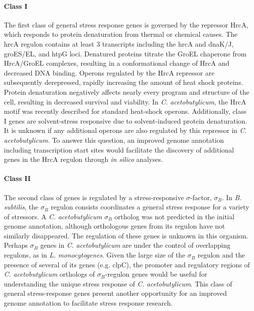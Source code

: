 \paragraph{Class I}
The first class of general stress response genes is governed by the repressor HrcA, which responds to protein denaturation from thermal or chemical causes. The hrcA regulon contains at least 3 transcripts including the hrcA and dnaK/J, groES/EL, and htpG loci.\cite{42} Denatured proteins titrate the GroEL chaperone from HrcA/GroEL complexes, resulting in a conformational change of HrcA and decreased DNA binding.\cite{77,78} Operons regulated by the HrcA repressor are subsequently derepressed, rapidly increasing the amount of heat shock proteins. Protein denaturation negatively affects nearly every program and structure of the cell, resulting in decreased survival and viability. In \textit{C. acetobutylicum}, the HrcA motif was recently described for standard heat-shock operons.\cite{42} Additionally, class I genes are solvent-stress responsive due to solvent-induced protein denaturation.\cite{74,75} It is unknown if any additional operons are also regulated by this repressor in \textit{C. acetobutylicum}. To answer this question, an improved genome annotation including transcription start sites would facilitate the discovery of additional genes in the HrcA regulon through \textit{in silico} analyses.

\paragraph{Class II}
The second class of genes is regulated by a stress-responsive $\sigma$-factor, $\sigma_{B}$. In \textit{B. subtilis}, the $\sigma_B$ regulon consists coordinates a general stress response for a variety of stressors. A \textit{C. acetobutylicum} $\sigma_{B}$ ortholog was not predicted in the initial genome annotation,\cite{91,42} although orthologous genes from its regulon have not similarly disappeared.\cite{132,133,134,135} The regulation of these genes is unknown in this organism. Perhaps $\sigma_{B}$ genes in \textit{C. acetobutylicum} are under the control of overlapping regulons, as in \textit{L. monocytogenes}.\cite{193} Given the large size of the $\sigma_{B}$ regulon and the presence of several of its genes (e.g. clpC\cite{132}), the promoter and regulatory regions of \textit{C. acetobutylicum} orthologs of $\sigma_{B}$-regulon genes would be useful for understanding the unique stress response of \textit{C. acetobutylicum}. This class of general stress-response genes present another opportunity for an improved genome annotation to facilitate stress response research.

